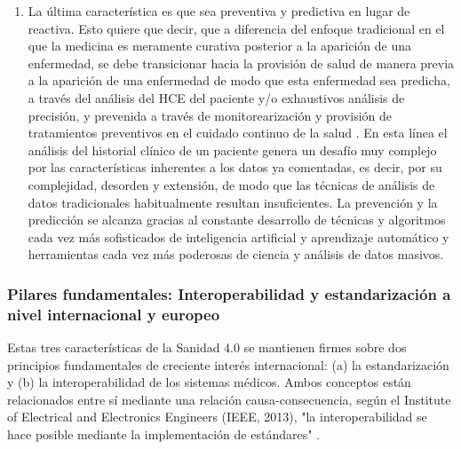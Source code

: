 \begin{enumerate}
    \item La última característica es que sea preventiva y predictiva en lugar de reactiva. Esto quiere que decir, que a diferencia del enfoque tradicional en el que la medicina es meramente curativa posterior a la aparición de una enfermedad, se debe transicionar hacia la provisión de salud de manera previa a la aparición de una enfermedad de modo que esta enfermedad sea predicha, a través del análisis del HCE del paciente y/o exhaustivos análisis de precisión, y prevenida a través de monitorearización y provisión de tratamientos preventivos en el cuidado continuo de la salud \cite{ruiz2023inteligencia}. En esta línea el análisis del historial clínico de un paciente genera un desafío muy complejo por las características inherentes a los datos ya comentadas, es decir, por su complejidad, desorden y extensión, de modo que las técnicas de análisis de datos tradicionales habitualmente resultan insuficientes. La prevención y la predicción se alcanza gracias al constante desarrollo de técnicas y algoritmos cada vez más sofisticados de inteligencia artificial y aprendizaje automático y herramientas cada vez más poderosas de ciencia y análisis de datos masivos.

\end{enumerate}



\subsubsection{Pilares fundamentales: Interoperabilidad y estandarización a nivel internacional y europeo}

Estas tres características de la Sanidad 4.0 se mantienen firmes sobre dos principios fundamentales de creciente interés internacional: (a) la estandarización y (b) la interoperabilidad de los sistemas médicos. Ambos conceptos están relacionados entre sí mediante una relación causa-consecuencia, según el Institute of Electrical and Electronics Engineers (IEEE, 2013), "la interoperabilidad se hace posible mediante la implementación de estándares" \cite{berryman2013data}.

